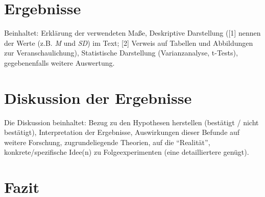 \documentclass[11pt,a4paper,ngerman]{article}
\begin{document}
\section{Ergebnisse}
Beinhaltet: Erklärung der verwendeten Maße, Deskriptive Darstellung ([1] nennen der Werte (z.B. \textit{M} und \textit{SD}) im Text; [2] Verweis auf Tabellen und Abbildungen zur Veranschaulichung), Statistische Darstellung (Varianzanalyse, t-Tests), gegebenenfalls weitere Auswertung.





\section{Diskussion der Ergebnisse}
Die Diskussion beinhaltet: Bezug zu den Hypothesen herstellen (bestätigt / nicht bestätigt), Interpretation der Ergebnisse, Auswirkungen dieser Befunde auf weitere Forschung, zugrundeliegende Theorien, auf die "`Realität"', konkrete/spezifische Idee(n) zu Folgeexperimenten (eine detailliertere genügt).

\section{Fazit}

\end{document}
